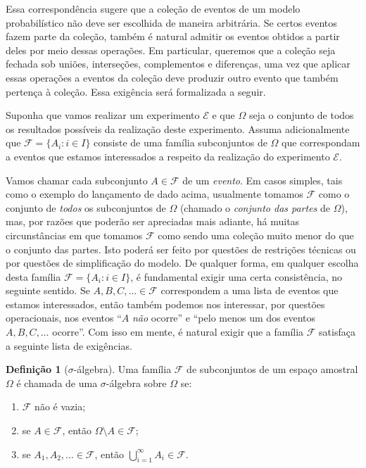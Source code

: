 \documentclass[12pt,portuguese]{article}
\theoremstyle{definition}
\newtheorem{definition}[definition]{Definição}
\begin{document}
Essa correspondência sugere que a coleção de eventos de um modelo
probabilístico não deve ser escolhida de maneira arbitrária. Se certos eventos
fazem parte da coleção, também é natural admitir os eventos obtidos a partir
deles por meio dessas operações. Em particular, queremos que a coleção seja
fechada sob uniões, interseções, complementos e diferenças, 
uma vez que aplicar essas operações a
eventos da coleção deve produzir outro evento que também pertença à coleção.
Essa exigência será formalizada a seguir.

\medskip 

Suponha que vamos realizar um experimento $\mathcal{E}$ e que $\Omega$
seja o conjunto de todos os resultados possíveis da realização deste experimento.
Assuma adicionalmente que \(\mathcal{F} = \{A_i : i \in I\}\) consiste de uma família
subconjuntos de \(\Omega\) que correspondam a eventos que estamos interessados
a respeito da realização do experimento $\mathcal{E}$. 

Vamos chamar cada subconjunto \(A \in \mathcal{F}\) de um \emph{evento}. 
Em casos simples, tais como o
exemplo do lançamento de dado acima, usualmente tomamos \(\mathcal{F}\) como o
conjunto de \emph{todos} os subconjuntos de \(\Omega\) (chamado o
\emph{conjunto das partes} de \(\Omega\)), mas, por razões que poderão ser
apreciadas mais adiante, há muitas circunstâncias em que tomamos
\(\mathcal{F}\) como sendo uma coleção muito menor do que o conjunto das partes.
Isto poderá ser feito por questões de restrições técnicas ou por questões de simplificação do modelo. 
De qualquer forma, em qualquer escolha desta família \(\mathcal{F} = \{A_i : i \in I\}\),
é fundamental exigir uma certa consistência, no seguinte sentido. Se
\(A, B, C, \dots \in \mathcal{F}\) correspondem a uma lista de eventos 
que estamos interessados, então também podemos nos interessar, por questões operacionais,
nos eventos ``\(A\) \emph{não} ocorre'' e ``pelo menos um dos eventos \(A, B,
C, \dots\) ocorre''. Com isso em mente, é natural exigir que a família \(\mathcal{F}\)
satisfaça a seguinte lista de exigências.

\begin{definition}[\(\sigma\)-álgebra]
Uma família \(\mathcal{F}\) de subconjuntos de um espaço amostral
\(\Omega\) é chamada de uma $\sigma$-álgebra sobre \(\Omega\) se:
\begin{enumerate}[label=(\roman*), ref=\roman*]
\item \(\mathcal{F}\) não é vazia; \label{eq:1.2}
\item se \(A \in \mathcal{F}\), então \(\Omega \setminus A \in
\mathcal{F}\); \label{eq:1.3}
\item se \(A_1, A_2, \dots \in \mathcal{F}\), então
\(\bigcup_{i=1}^{\infty} A_i \in \mathcal{F}\). \label{eq:1.4}
\end{enumerate}
\end{definition}
\end{document}
